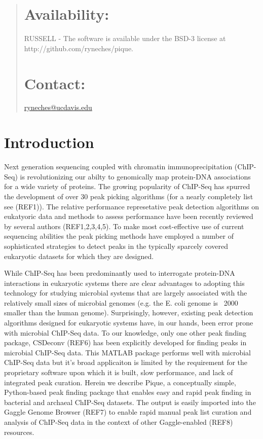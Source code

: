 \documentclass{bioinfo} %
\begin{document}
{\begin{abstract}
\section{Availability:} RUSSELL - The software is available under the
BSD-3 license at http://github.com/ryneches/pique.

\section{Contact:} \href{ryneches@ucdavis.edu}{ryneches@ucdavis.edu}

\end{abstract}

\section{Introduction} Next generation sequencing coupled with chromatin
immunoprecipitation (ChIP-Seq) is revolutionizing our abilty to
genomically map protein-DNA associations for a wide variety of proteins.
The growing popularity of ChIP-Seq has spurred the development of over
30 peak picking algorithms (for a nearly completely list see (REF1)). The
relative performance represetative peak detection algorithms on
eukatyoric data and methods to assess performance have been recently
reviewed by several authors (REF1,2,3,4,5).  To make most cost-effective use
of current sequencing abilities the peak picking methods have employed a
number of sophisticated strategies to detect peaks in the typically
sparcely covered eukaryotic datasets for which they are designed.

While ChIP-Seq has been predominantly used to interrogate protein-DNA
interactions in eukaryotic systems there are clear advantages to
adopting this technology for studying microbial systems that are largely
associated with the relatively small sizes of microbial genomes (e.g.
the E. coli genome is ~2000 smaller than the human genome).
Surprisingly, however, existing peak detection algorithms designed for
eukaryotic systems have, in our hands, been error prone with microbial
ChIP-Seq data.  To our knowledge, only one other peak finding package,
CSDeconv (REF6) has been explicitly developed for finding peaks in
microbial ChIP-Seq data.  This MATLAB package performs well with
microbial ChIP-Seq data but it's broad applicaiton is limited by the
requirement for the proprietary software upon which it is built,
slow performance, and lack of integrated peak curation. 
Herein we describe Pique, a conceptually simple, Python-based peak
finding package that enables easy and rapid peak finding in bacterial
and archaeal ChIP-Seq datasets.  The output is easily imported into the
Gaggle Genome Browser (REF7) to enable rapid manual peak list curation
and analysis of ChIP-Seq data in the context of other Gaggle-enabled
(REF8) resources.

}
\end{document}
